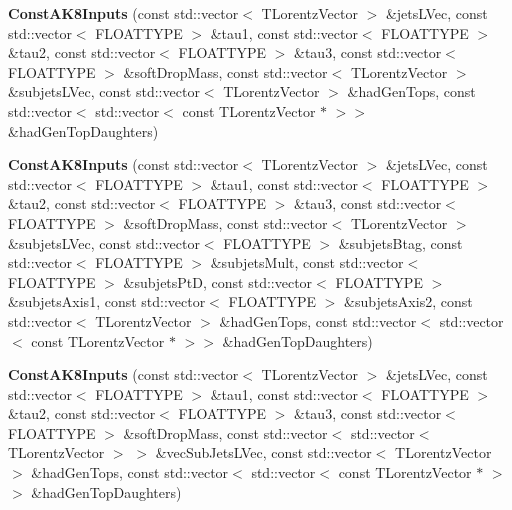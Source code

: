 \begin{DoxyCompactItemize}
\item 
\hypertarget{classttUtility_1_1ConstAK8Inputs_aa102483387045bf6e6ca9250f39d1a09}{{\bfseries Const\-A\-K8\-Inputs} (const std\-::vector$<$ T\-Lorentz\-Vector $>$ \&jets\-L\-Vec, const std\-::vector$<$ F\-L\-O\-A\-T\-T\-Y\-P\-E $>$ \&tau1, const std\-::vector$<$ F\-L\-O\-A\-T\-T\-Y\-P\-E $>$ \&tau2, const std\-::vector$<$ F\-L\-O\-A\-T\-T\-Y\-P\-E $>$ \&tau3, const std\-::vector$<$ F\-L\-O\-A\-T\-T\-Y\-P\-E $>$ \&soft\-Drop\-Mass, const std\-::vector$<$ T\-Lorentz\-Vector $>$ \&subjets\-L\-Vec, const std\-::vector$<$ T\-Lorentz\-Vector $>$ \&had\-Gen\-Tops, const std\-::vector$<$ std\-::vector$<$ const T\-Lorentz\-Vector $\ast$ $>$$>$ \&had\-Gen\-Top\-Daughters)}\label{classttUtility_1_1ConstAK8Inputs_aa102483387045bf6e6ca9250f39d1a09}

\item 
\hypertarget{classttUtility_1_1ConstAK8Inputs_a55c6c535734b2ebcabc13821d64848f6}{{\bfseries Const\-A\-K8\-Inputs} (const std\-::vector$<$ T\-Lorentz\-Vector $>$ \&jets\-L\-Vec, const std\-::vector$<$ F\-L\-O\-A\-T\-T\-Y\-P\-E $>$ \&tau1, const std\-::vector$<$ F\-L\-O\-A\-T\-T\-Y\-P\-E $>$ \&tau2, const std\-::vector$<$ F\-L\-O\-A\-T\-T\-Y\-P\-E $>$ \&tau3, const std\-::vector$<$ F\-L\-O\-A\-T\-T\-Y\-P\-E $>$ \&soft\-Drop\-Mass, const std\-::vector$<$ T\-Lorentz\-Vector $>$ \&subjets\-L\-Vec, const std\-::vector$<$ F\-L\-O\-A\-T\-T\-Y\-P\-E $>$ \&subjets\-Btag, const std\-::vector$<$ F\-L\-O\-A\-T\-T\-Y\-P\-E $>$ \&subjets\-Mult, const std\-::vector$<$ F\-L\-O\-A\-T\-T\-Y\-P\-E $>$ \&subjets\-Pt\-D, const std\-::vector$<$ F\-L\-O\-A\-T\-T\-Y\-P\-E $>$ \&subjets\-Axis1, const std\-::vector$<$ F\-L\-O\-A\-T\-T\-Y\-P\-E $>$ \&subjets\-Axis2, const std\-::vector$<$ T\-Lorentz\-Vector $>$ \&had\-Gen\-Tops, const std\-::vector$<$ std\-::vector$<$ const T\-Lorentz\-Vector $\ast$ $>$$>$ \&had\-Gen\-Top\-Daughters)}\label{classttUtility_1_1ConstAK8Inputs_a55c6c535734b2ebcabc13821d64848f6}

\item 
\hypertarget{classttUtility_1_1ConstAK8Inputs_a528a5eb1b2efbec86749a7cc9867cad9}{{\bfseries Const\-A\-K8\-Inputs} (const std\-::vector$<$ T\-Lorentz\-Vector $>$ \&jets\-L\-Vec, const std\-::vector$<$ F\-L\-O\-A\-T\-T\-Y\-P\-E $>$ \&tau1, const std\-::vector$<$ F\-L\-O\-A\-T\-T\-Y\-P\-E $>$ \&tau2, const std\-::vector$<$ F\-L\-O\-A\-T\-T\-Y\-P\-E $>$ \&tau3, const std\-::vector$<$ F\-L\-O\-A\-T\-T\-Y\-P\-E $>$ \&soft\-Drop\-Mass, const std\-::vector$<$ std\-::vector$<$ T\-Lorentz\-Vector $>$ $>$ \&vec\-Sub\-Jets\-L\-Vec, const std\-::vector$<$ T\-Lorentz\-Vector $>$ \&had\-Gen\-Tops, const std\-::vector$<$ std\-::vector$<$ const T\-Lorentz\-Vector $\ast$ $>$$>$ \&had\-Gen\-Top\-Daughters)}\label{classttUtility_1_1ConstAK8Inputs_a528a5eb1b2efbec86749a7cc9867cad9}


\end{DoxyCompactItemize}
